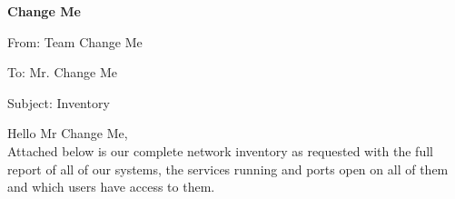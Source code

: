 \documentclass[12]{article}
\renewcommand{\title}[3]{
    \begin{flushleft}
        \Large
        \textbf{#1}

        \vspace{0.4cm}
        \large
        From: #2

        \vspace{0.4cm}
        To: #3

        \vspace{0.4cm}
        Subject: Inventory
    \end{flushleft}
}
\newcommand{\introduction}[1]{
    Hello #1, \\

    Attached below is our complete network inventory as requested with the full report of all of our systems, the services running and ports open on all of them and which users have access to them.
}
\begin{document}
\title{Change Me}{Team Change Me}{Mr. Change Me}

\vspace{0.9cm}

\introduction{Mr Change Me}

\vspace{0.9cm}
\end{document}
